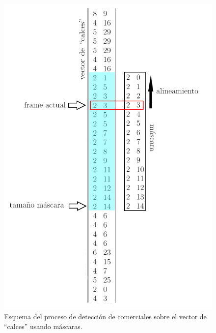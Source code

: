 \documentclass[14pt,letterpaper,hidelinks]{extarticle}
\begin{document}
\begin{figure}[ht!]
\centering 
\captionsetup{justification=centering,margin=2cm}
\includegraphics[scale=0.6]{img/matcheo.png}
\caption{Esquema del proceso de detección de comerciales sobre el vector de ``calces'' usando máscaras.\label{fig:match}}
\end{figure} 
\end{document}
